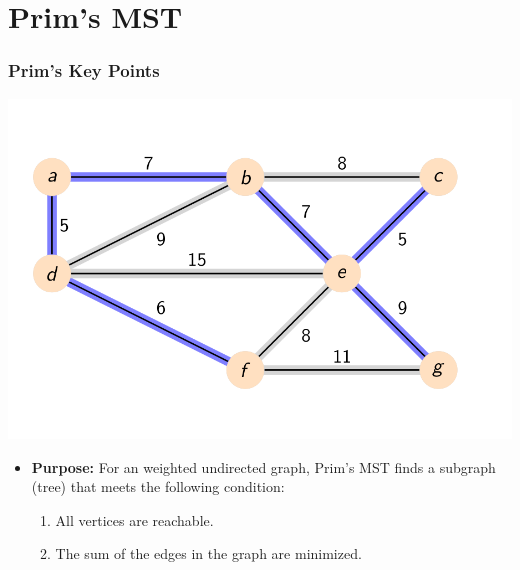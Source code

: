 \documentclass{beamer}
\begin{document}
\section{Prim's MST}

\begin{frame}[fragile]
    \frametitle{Prim's Key Points}
    \begin{minipage}{0.49\textwidth}
        \centering
        \includegraphics[width=\textwidth]{./imgs/graph-1.png}
    \end{minipage}
    \hfill
    \begin{minipage}{0.49\textwidth}
        \centering
        
    \end{minipage}
    \begin{itemize}
        \item \textbf{Purpose:} For an weighted undirected graph, Prim's MST finds a subgraph (tree) that meets the following condition:
            \begin{enumerate}
                \item All vertices are reachable.
                \item The sum of the edges in the graph are minimized.
            \end{enumerate}
    \end{itemize}
\end{frame}
\end{document}
